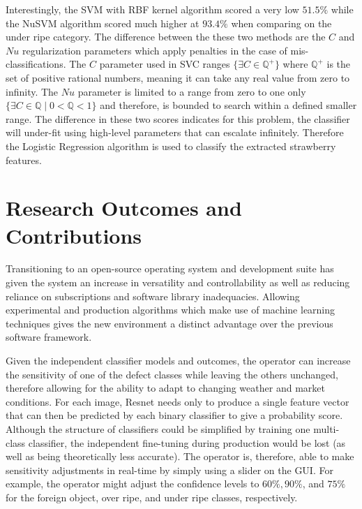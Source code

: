 \documentclass[fleqn,twoside,12pt]{report}
\begin{document}
Interestingly, the SVM with RBF kernel algorithm scored a very low $51.5\%$ while the NuSVM algorithm scored much higher at $93.4\%$ when comparing on the under ripe category. The difference between the these two methods are the $C$ and $Nu$ regularization parameters which apply penalties in the case of mis-classifications. The $C$ parameter used in SVC ranges $\{\exists C\in\mathbb{Q^+}\}$ where $\mathbb{Q^+}$ is the set of positive rational numbers, meaning it can take any real value from zero to infinity. The $Nu$ parameter is limited to a range from zero to one only $\{\exists C\in\mathbb{Q} \mid 0 <\mathbb{Q} < 1\}$ and therefore, is bounded to search within a defined smaller range. The difference in these two scores indicates for this problem, the classifier will under-fit using high-level parameters that can escalate infinitely. Therefore the Logistic Regression algorithm is used to classify the extracted strawberry features. 

\section{Research Outcomes and Contributions}


Transitioning to an open-source operating system and development suite has given the system an increase in versatility and controllability as well as reducing reliance on subscriptions and software library inadequacies. Allowing experimental and production algorithms which make use of machine learning techniques gives the new environment a distinct advantage over the previous software framework.

Given the independent classifier models and outcomes, the operator can increase the sensitivity of one of the defect classes while leaving the others unchanged, therefore allowing for the ability to adapt to changing weather and market conditions. For each image, Resnet needs only to produce a single feature vector that can then be predicted by each binary classifier to give a probability score. Although the structure of classifiers could be simplified by training one multi-class classifier, the independent fine-tuning during production would be lost (as well as being theoretically less accurate). The operator is, therefore, able to make sensitivity adjustments in real-time by simply using a slider on the GUI. For example, the operator might adjust the confidence levels to $60\%, 90\%$, and $75\%$ for the foreign object, over ripe, and under ripe classes, respectively.  
\end{document}
